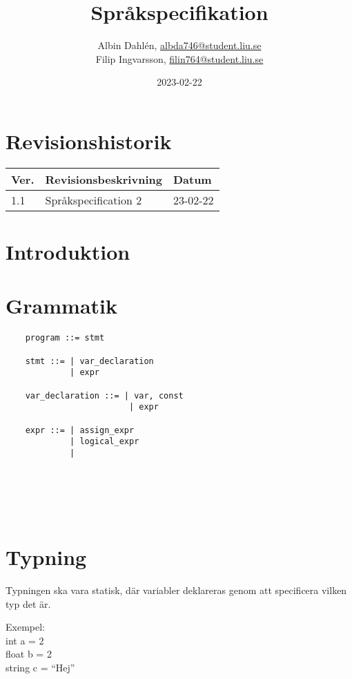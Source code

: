 \documentclass{TDP003mall}
\author{Albin Dahlén, \url{albda746@student.liu.se}\\
Filip Ingvarsson, \url{filin764@student.liu.se}}
\title{Språkspecifikation}
\date{2023-02-22}
\begin{document}
    \projectpage

    \tableofcontents

    \section*{Revisionshistorik}
    \begin{table}[!h]
        \begin{tabularx}{\linewidth}{|l|X|l|}
            \hline
            Ver. & Revisionsbeskrivning      & Datum    \\\hline
            1.1  & Språkspecification 2     & 23-02-22 \\\hline
        \end{tabularx}
    \end{table}

    \newpage


    \section{Introduktion}

    \section{Grammatik}
    \begin{verbatim}
    program ::= stmt

    stmt ::= | var_declaration
             | expr

    var_declaration ::= | var, const
                         | expr         
             
    expr ::= | assign_expr
             | logical_expr
             | 
    



    
    \end{verbatim}

    \section{Typning}
    Typningen ska vara statisk, där variabler deklareras genom att specificera vilken typ det är.

    Exempel: \\
    int a = 2 \\
    float b = 2 \\
    string c = ``Hej''
\end{document}

